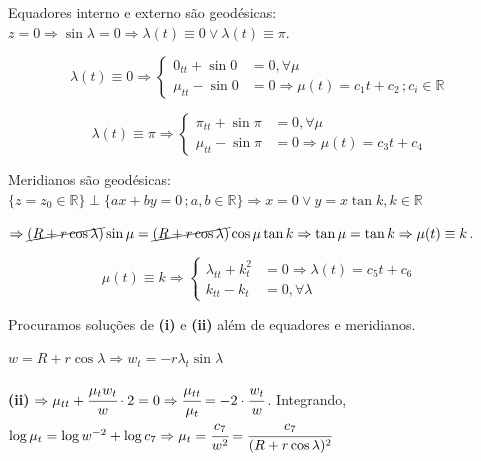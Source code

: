 \documentclass[10pt,a4paper]{article}
\begin{document}
		Equadores interno e externo s\~ao geod\'esicas: $z = 0 \Rightarrow \sin \lambda = 0 \Rightarrow \lambda(t) \equiv 0 \vee \lambda(t) \equiv \pi$.

		\begin{equation*}
		  \lambda(t) \equiv 0 \Rightarrow
			\left\{\begin{aligned}
			    0_{tt} + \sin 0 &= 0, \forall \mu \\
			    \mu_{tt} - \sin 0 &= 0 \Rightarrow \mu(t) = c_1 t + c_2 \,; c_i \in \mathbb{R}
			\end{aligned}
			\right.
		\end{equation*}

		\begin{equation*}
		  \lambda(t) \equiv \pi \Rightarrow
			\left\{\begin{aligned}
			    \pi_{tt} + \sin \pi &= 0, \forall \mu \\
			    \mu_{tt} - \sin \pi &= 0 \Rightarrow \mu(t) = c_3 t + c_4
			\end{aligned}
			\right.
		\end{equation*}

		Meridianos s\~ao geod\'esicas: $\{ z = z_0 \in \mathbb{R} \} \perp \{ ax + by = 0\,; a, b \in \mathbb{R} \} \Rightarrow x = 0 \vee y = x \tan k, k \in \mathbb{R}$

		$\Rightarrow \cancel{(R + r \cos \lambda)} \sin \mu = \cancel{(R + r \cos \lambda)} \cos \mu \tan k  \Rightarrow \tan \mu = \tan k \Rightarrow \mu(t) \equiv k$.

		\begin{equation*}
		  \mu(t) \equiv k \Rightarrow
			\left\{\begin{aligned}
			    \lambda_{tt} + k_t^2 &= 0 \Rightarrow \lambda(t) = c_5 t + c_6 \\
			    k_{tt} - k_t &= 0, \forall \lambda
			\end{aligned}
			\right.
		\end{equation*}

		Procuramos solu\c{c}\~oes de \textbf{(i)} e \textbf{(ii)} al\'em de equadores e meridianos.

		\vspace{3mm}

		$w = R + r \cos \lambda \Rightarrow w_t = -r \lambda_t \sin \lambda$

		\textbf{(ii)} $\Rightarrow \mu_{tt} + \cfrac{\mu_t w_t}{w} \cdot 2 = 0 \Rightarrow \cfrac{\mu_{tt}}{\mu_t} = -2 \cdot \cfrac{w_t}{w}\,$. Integrando, $\log \mu_t = \log w^{-2} + \log c_7 \Rightarrow \mu_t = \cfrac{c_7}{w^2} = \cfrac{c_7}{(R + r \cos \lambda)^2}$
\end{document}
